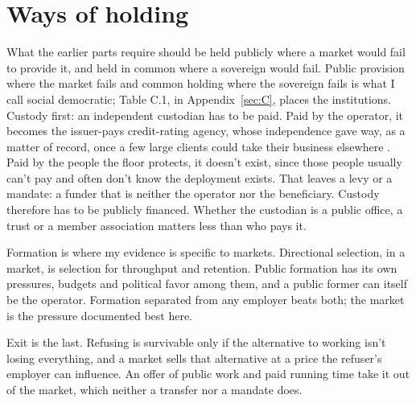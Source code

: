\section{Ways of holding}
\label{sec:26.1}
What the earlier parts require should be held publicly where a market would fail to provide it, and held in common where a sovereign would fail. Public provision where the market fails and common holding where the sovereign fails is what I call social democratic; Table C.1, in Appendix~\ref{sec:C}, places the institutions. Custody first: an independent custodian has to be paid. Paid by the operator, it becomes the issuer-pays credit-rating agency, whose independence gave way, as a matter of record, once a few large clients could take their business elsewhere \autocite{white2010rating}. Paid by the people the floor protects, it doesn't exist, since those people usually can't pay and often don't know the deployment exists. That leaves a levy or a mandate: a funder that is neither the operator nor the beneficiary. Custody therefore has to be publicly financed. Whether the custodian is a public office, a trust or a member association matters less than who pays it.

Formation is where my evidence is specific to markets. Directional selection, in a market, is selection for throughput and retention.
Public formation has its own pressures, budgets and political favor among them, and a public former can itself be the operator. Formation separated from any employer beats both; the market is the pressure documented best here.

Exit is the last. Refusing is survivable only if the alternative to working isn't losing everything, and a market sells that alternative at a price the refuser's employer can influence. An offer of public work and paid running time take it out of the market, which neither a transfer nor a mandate does.

